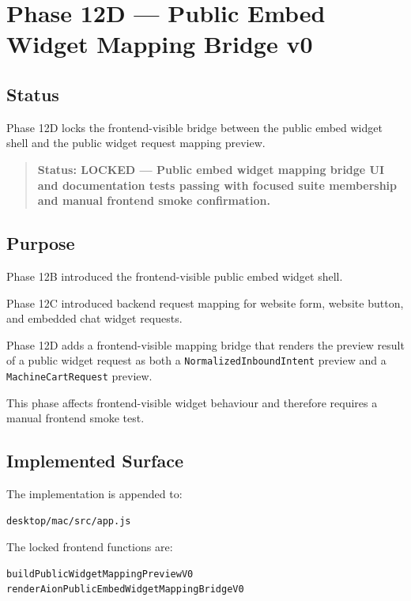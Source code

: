 \section{Phase 12D --- Public Embed Widget Mapping Bridge v0}
\label{sec:aion-public-embed-widget-mapping-bridge-v0}

\subsection{Status}

Phase 12D locks the frontend-visible bridge between the public embed widget shell and the public widget request mapping preview.

\begin{quote}
\textbf{Status: LOCKED --- Public embed widget mapping bridge UI and documentation tests passing with focused suite membership and manual frontend smoke confirmation.}
\end{quote}

\subsection{Purpose}

Phase 12B introduced the frontend-visible public embed widget shell.

Phase 12C introduced backend request mapping for website form, website button, and embedded chat widget requests.

Phase 12D adds a frontend-visible mapping bridge that renders the preview result of a public widget request as both a \texttt{NormalizedInboundIntent} preview and a \texttt{MachineCartRequest} preview.

This phase affects frontend-visible widget behaviour and therefore requires a manual frontend smoke test.

\subsection{Implemented Surface}

The implementation is appended to:

\begin{verbatim}
desktop/mac/src/app.js
\end{verbatim}

The locked frontend functions are:

\begin{verbatim}
buildPublicWidgetMappingPreviewV0
renderAionPublicEmbedWidgetMappingBridgeV0
\end{verbatim}

